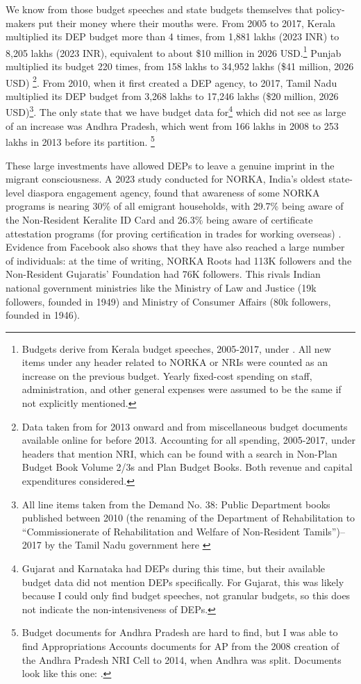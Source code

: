 \documentclass[12pt]{article}
\begin{document}
   We know from those budget speeches and state budgets themselves that policy-makers put their money where their mouths were. From 2005 to 2017, Kerala multiplied its DEP budget more than 4 times, from 1,881 lakhs (2023 INR) to 8,205 lakhs (2023 INR), equivalent to about \$10 million in 2026 USD.\footnote{Budgets derive from Kerala budget speeches, 2005-2017, under \citet{noauthor_kerala_nodate}. All new items under any header related to NORKA or NRIs were counted as an increase on the previous budget. Yearly fixed-cost spending on staff, administration, and other general expenses were assumed to be the same if not explicitly mentioned.} Punjab multiplied its budget 220 times, from 158 lakhs to 34,952 lakhs (\$41 million, 2026 USD) \footnote{Data taken from \citet{noauthor_department_nodate} for 2013 onward and from miscellaneous budget documents available online for before 2013. Accounting for all spending, 2005-2017, under headers that mention NRI, which can be found with a search in Non-Plan Budget Book Volume 2/3s and Plan Budget Books. Both revenue and capital expenditures considered.}. From 2010, when it first created a DEP agency, to 2017, Tamil Nadu multiplied its DEP budget from 3,268 lakhs to 17,246 lakhs (\$20 million, 2026 USD)\footnote{All line items taken from the Demand No. 38: Public Department books published between 2010 (the renaming of the Department of Rehabilitation to ``Commissionerate of Rehabilitation and Welfare of Non-Resident Tamils'')--2017 by the Tamil Nadu government here \citep{noauthor_budget_nodate}
   }. The only state that we have budget data for\footnote{Gujarat and Karnataka had DEPs during this time, but their available budget data did not mention DEPs specifically. For Gujarat, this was likely because I could only find budget speeches, not granular budgets, so this does not indicate the non-intensiveness of DEPs.} which did not see as large of an increase was Andhra Pradesh, which went from 166 lakhs in 2008 to 253 lakhs in 2013 before its partition. \footnote{Budget documents for Andhra Pradesh are hard to find, but I was able to find Appropriations Accounts documents for AP from the 2008 creation of the Andhra Pradesh NRI Cell to 2014, when Andhra was split. Documents look like this one: \citep{government_of_andhra_pradesh_government_2009}.}

   
   These large investments have allowed DEPs to leave a genuine imprint in the migrant consciousness. A 2023 study conducted for NORKA, India's oldest state-level diaspora engagement agency, found that awareness of some NORKA programs is nearing 30\% of all emigrant households, with 29.7\% being aware of the Non-Resident Keralite ID Card and 26.3\% being aware of certificate attestation programs (for proving certification in trades for working overseas) \citep{rajan_kerala_2023}. Evidence from Facebook also shows that they have also reached a large number of individuals: at the time of writing, NORKA Roots had 113K followers and the Non-Resident Gujaratis' Foundation had 76K followers. This rivals Indian national government ministries like the Ministry of Law and Justice (19k followers, founded in 1949) and Ministry of Consumer Affairs (80k followers, founded in 1946). 
   
\end{document}
